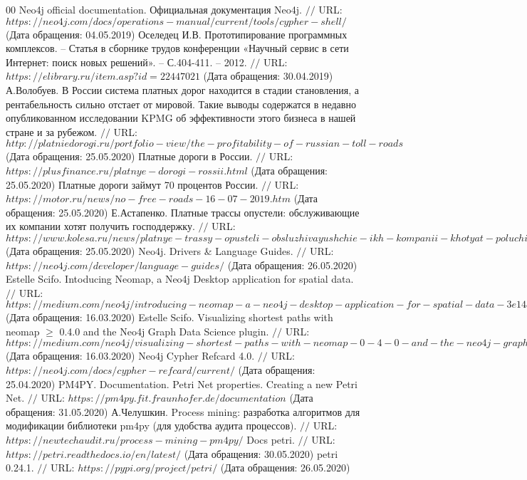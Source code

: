 \begin{thebibliography}{00}
	Neo4j official documentation. Официальная документация Neo4j. $//$ URL: $https://neo4j.com/docs/operations-manual/current/tools/cypher-shell/$ (Дата обращения: 04.05.2019)
	Оселедец И.В. Прототипирование программных комплексов. -- Статья в сборнике трудов конференции «Научный сервис в сети Интернет: поиск новых решений». -- С.404-411. -- 2012. $//$ URL: $https://elibrary.ru/item.asp?id=22447021$ (Дата обращения: 30.04.2019)
	А.Волобуев. В России система платных дорог находится в стадии становления, а рентабельность сильно отстает от мировой. Такие выводы содержатся в недавно опубликованном исследовании KPMG об эффективности этого бизнеса в нашей стране и за рубежом. $//$ URL: $http://platniedorogi.ru/portfolio-view/the-profitability-of-russian-toll-roads$ (Дата обращения: 25.05.2020)
	Платные дороги в России. $//$ URL: $https://plusfinance.ru/platnye-dorogi-rossii.html$ (Дата обращения: 25.05.2020)
	Платные дороги займут 70 процентов России. $//$ URL: $https://motor.ru/news/no-free-roads-16-07-2019.htm$ (Дата обращения: 25.05.2020)
	Е.Астапенко. Платные трассы опустели: обслуживающие их компании хотят получить господдержку. $//$ URL: $https://www.kolesa.ru/news/platnye-trassy-opusteli-obsluzhivayushchie-ikh-kompanii-khotyat-poluchit-gospodderzhku$ (Дата обращения: 25.05.2020)
	Neo4j. Drivers \& Language Guides. $//$ URL: $https://neo4j.com/developer/language-guides/$ (Дата обращения: 26.05.2020)
	Estelle Scifo. Intoducing Neomap, a Neo4j Desktop application for spatial data. $//$ URL: $https://medium.com/neo4j/introducing-neomap-a-neo4j-desktop-application-for-spatial-data-3e14aad59db2$ (Дата обращения: 16.03.2020)
	Estelle Scifo. Visualizing shortest paths with neomap $\geq$ 0.4.0 and the Neo4j Graph Data Science plugin. $//$ URL: $https://medium.com/neo4j/visualizing-shortest-paths-with-neomap-0-4-0-and-the-neo4j-graph-data-science-plugin-18db92f680de$ (Дата обращения: 16.03.2020)
	Neo4j Cypher Refcard 4.0. $//$ URL: $https://neo4j.com/docs/cypher-refcard/current/$ (Дата обращения: 25.04.2020)
	PM4PY. Documentation. Petri Net properties. Creating a new Petri Net. $//$ URL: $https://pm4py.fit.fraunhofer.de/documentation$ (Дата обращения: 31.05.2020)
	А.Челушкин. Process mining: разработка алгоритмов для модификации библиотеки pm4py (для удобства аудита процессов). $//$ URL: $https://newtechaudit.ru/process-mining-pm4py/$
	Docs petri. $//$ URL: $https://petri.readthedocs.io/en/latest/$ (Дата обращения: 30.05.2020)
	petri 0.24.1. $//$ URL: $https://pypi.org/project/petri/$ (Дата обращения: 26.05.2020)
\end{thebibliography}
